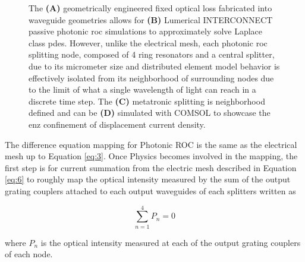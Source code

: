 \begin{figure}[ht]
\centering{}
\caption{The \textbf{(A)} geometrically engineered fixed optical loss fabricated into waveguide geometries allows for \textbf{(B)} Lumerical INTERCONNECT passive photonic \acrshort{roc} simulations to approximately solve Laplace class \acrshort{pde}s. However, unlike the electrical mesh, each photonic \acrshort{roc} splitting node, composed of 4 ring resonators and a central splitter, due to its micrometer size and distributed element model behavior is effectively isolated from its neighborhood of surrounding nodes due to the limit of what a single wavelength of light can reach in a discrete time step. The \textbf{(C)} metatronic splitting is neighborhood defined and can be \textbf{(D)} simulated with COMSOL to showcase the \acrshort{enz} confinement of displacement current density.}
\label{fig:photonic_metatronic_simulations}
\end{figure}

\par The difference equation mapping for Photonic ROC is the same as the electrical mesh up to Equation \ref{eq:3}. Once Physics becomes involved in the mapping, the first step is for current summation from the electric mesh described in Equation \ref{eq:6} to roughly map the optical intensity measured by the sum of the output grating couplers attached to each output waveguides of each splitters written as 
 
\begin{dmath}\label{eq_lightDual}
	\sum_{n=1}^{4} P_n = 0 
\end{dmath}

where $P_n$ is the optical intensity measured at each of the output grating couplers of each node.